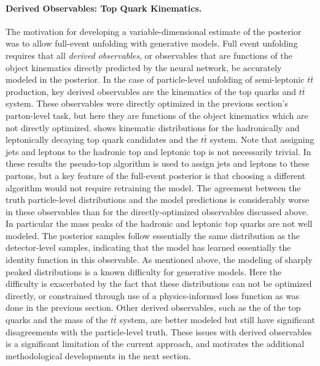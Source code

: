 \paragraph{Derived Observables: Top Quark Kinematics.}

The motivation for developing a variable-dimensional estimate of the posterior was to allow full-event unfolding with generative models.
Full event unfolding requires that all \textit{derived observables}, or observables that are functions of the object kinematics directly predicted by the neural network, be accurately modeled in the posterior.
In the case of particle-level unfolding of semi-leptonic $t\bar{t}$ production, key derived observables are the kinematics of the top quarks and $t\bar{t}$ system.
These observables were directly optimized in the previous section's parton-level task, but here they are functions of the object kinematics which are not directly optimized.
 shows kinematic distributions for the hadronically and leptonically decaying top quark candidates and the $t\bar{t}$ system.
Note that assigning jets and leptons to the hadronic top and leptonic top is not necessarily trivial.
In these results the pseudo-top algorithm is used to assign jets and leptons to these partons, but a key feature of the full-event posterior is that choosing a different algorithm would not require retraining the model.
The agreement between the truth particle-level distributions and the model predictions is considerably worse in these observables than for the directly-optimized observables discussed above.
In particular the mass peaks of the hadronic and leptonic top quarks are not well modeled.
The posterior samples follow essentially the same distribution as the detector-level samples, indicating that the model has learned essentially the identity function in this observable.
As mentioned above, the modeling of sharply peaked distributions is a known difficulty for generative models.
Here the difficulty is exacerbated by the fact that these distributions can not be optimized directly, or constrained through use of a physics-informed loss function as was done in the previous section.
Other derived observables, such as the \pt of the top quarks and the mass of the $t\bar{t}$ system, are better modeled but still have significant disagreements with the particle-level truth.
These issues with derived observables is a significant limitation of the current approach, and motivates the additional methodological developments in the next section.

